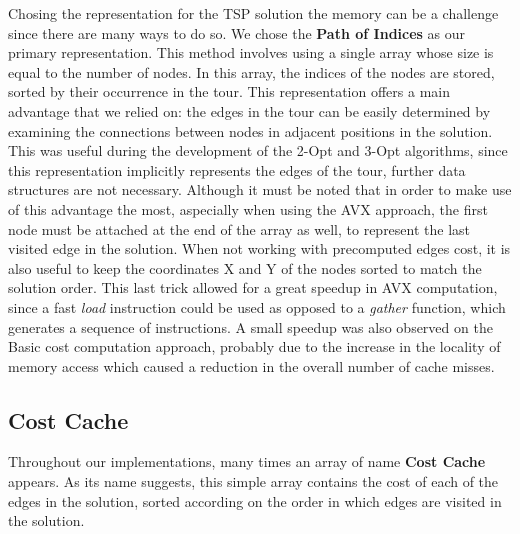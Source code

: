 Chosing the representation for the TSP solution the memory can be a challenge since there are many ways to do so.
We chose the \textbf{Path of Indices} as our primary representation.
This method involves using a single array whose size is equal to the number of nodes.
In this array, the indices of the nodes are stored, sorted by their occurrence in the tour.
This representation offers a main advantage that we relied on: the edges in the tour can be easily determined by examining the connections between nodes in adjacent positions in the solution.
This was useful during the development of the 2-Opt and 3-Opt algorithms, since this representation implicitly represents the edges of the tour, further data structures are not necessary.
Although it must be noted that in order to make use of this advantage the most, aspecially when using the AVX approach, the first node must be attached at the end of the array as well, to represent the last visited edge in the solution.
When not working with precomputed edges cost, it is also useful to keep the coordinates X and Y of the nodes sorted to match the solution order.
This last trick allowed for a great speedup in AVX computation, since a fast \textit{load} instruction could be used as opposed to a \textit{gather} function, which generates a sequence of instructions.
A small speedup was also observed on the Basic cost computation approach, probably due to the increase in the locality of memory access which caused a reduction in the overall number of cache misses.

\subsection{Cost Cache}

Throughout our implementations, many times an array of name \textbf{Cost Cache} appears.
As its name suggests, this simple array contains the cost of each of the edges in the solution, sorted according on the order in which edges are visited in the solution.

